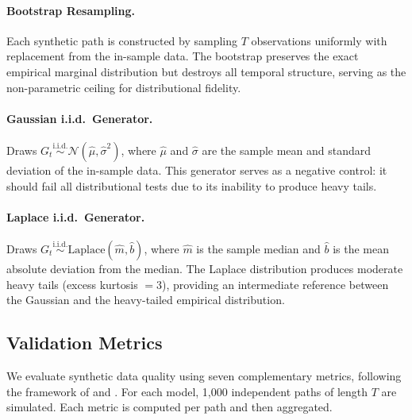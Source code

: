 \paragraph{Bootstrap Resampling.}
Each synthetic path is constructed by sampling $T$ observations uniformly with replacement from the in-sample data.
The bootstrap preserves the exact empirical marginal distribution but destroys all temporal structure, serving as the non-parametric ceiling for distributional fidelity.

\paragraph{Gaussian i.i.d.\ Generator.}
Draws $G_t \overset{\text{i.i.d.}}{\sim} \mathcal{N}(\hat{\mu}, \hat{\sigma}^2)$, where $\hat{\mu}$ and $\hat{\sigma}$ are the sample mean and standard deviation of the in-sample data.
This generator serves as a negative control: it should fail all distributional tests due to its inability to produce heavy tails.

\paragraph{Laplace i.i.d.\ Generator.}
Draws $G_t \overset{\text{i.i.d.}}{\sim} \text{Laplace}(\hat{m}, \hat{b})$, where $\hat{m}$ is the sample median and $\hat{b}$ is the mean absolute deviation from the median.
The Laplace distribution produces moderate heavy tails (excess kurtosis $= 3$), providing an intermediate reference between the Gaussian and the heavy-tailed empirical distribution.

\subsection{Validation Metrics}
\label{sec:metrics}

We evaluate synthetic data quality using seven complementary metrics, following the framework of \citet{stenger2024thinking} and \citet{alswaidan2026hybrid}.
For each model, 1,000 independent paths of length $T$ are simulated.
Each metric is computed per path and then aggregated.


